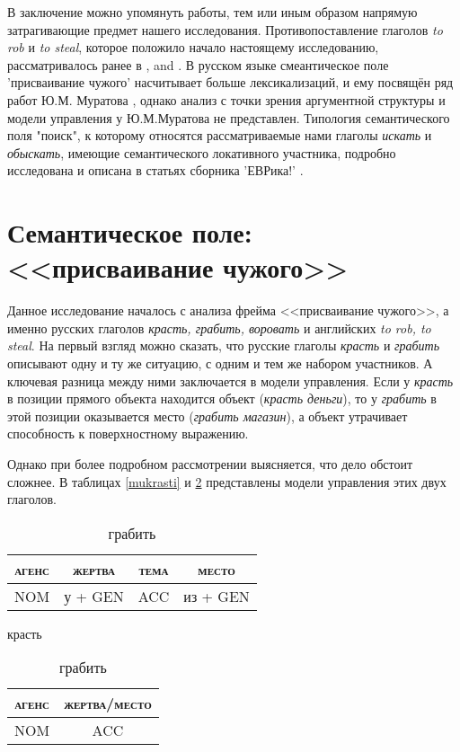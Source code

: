 \par В заключение можно упомянуть работы, тем или иным образом напрямую затрагивающие предмет нашего исследования. Противопоставление глаголов \textit{to rob} и \textit{to steal}, которое положило начало настоящему исследованию, рассматривалось ранее в   \citep[45-48]{goldberg1995constructions}, \citep{thorgren2005transaction} and \citep{van2007role}. В русском языке смеантическое поле 'присваивание чужого' насчитывает больше лексикализаций, и ему посвящён ряд работ Ю.М. Муратова \citep{муратов2014красться, муратовгенетическая}, однако анализ с точки зрения аргументной структуры и модели управления у Ю.М.Муратова не представлен. Типология семантического поля "поиск", к которому относятся рассматриваемые нами глаголы \textit{искать} и \textit{обыскать}, имеющие семантического локативного участника, подробно исследована и описана в статьях сборника 'ЕВРика!' \citep{еврика}.

\section{Семантическое поле: <<присваивание чужого>>} \label{grabit}
Данное исследование началось с анализа фрейма <<присваивание чужого>>, а именно русских глаголов \textit{красть, грабить, воровать} и английских \textit{to rob, to steal}. На первый взгляд можно сказать, что русские глаголы \textit{красть} и \textit{грабить} описывают одну и ту же ситуацию, с одним и тем же набором участников. А ключевая разница между ними заключается в модели управления. Если у \textit{красть} в позиции прямого объекта находится объект (\textit{красть деньги}), то у \textit{грабить} в этой позиции оказывается место (\textit{грабить магазин}), а объект утрачивает способность к поверхностному выражению. 

\par Однако при более подробном рассмотрении выясняется, что дело обстоит сложнее. В таблицах \ref{mukrasti} и \ref{mugrabiti} представлены модели управления этих двух глаголов. 


\begin{table}[H]
\vspace{+10pt}
\centering
\parbox{.49\linewidth}{
\centering
\begin{tabular}{c|c|c|c}
\hline
\textsc{агенс}&\textsc{жертва}&\textsc{тема}&\textsc{место}\\
\hline
NOM& у + GEN& ACC & из + GEN\\
\hline

\end{tabular}
\caption{красть}
\label{mukrasti}
}
\parbox{.49\linewidth}{
\centering
\begin{tabular}{c|c}
\hline
\textsc{агенс}&\textsc{жертва/место}\\
\hline
NOM&ACC\\
\hline
\end{tabular}
\caption{грабить}
\label{mugrabiti}
}
\end{table}

